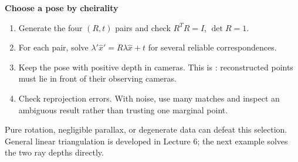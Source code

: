 \documentclass[letterpaper,11pt,english,openany,oneside]{jupyterBook}
\begin{document}
\begin{TextbookBox}
\textbf{Choose a pose by cheirality}\par\smallskip
\begin{enumerate}
%
\item {}
\sphinxAtStartPar
Generate the four \((R,t)\) pairs and check \(R^TR=I\), \(\det R=1\).

\item {}
\sphinxAtStartPar
For each pair, solve \(\lambda'\widehat x'=R\lambda\widehat x+t\) for several reliable correspondences.

\item {}
\sphinxAtStartPar
Keep the pose with positive depth in  cameras. This is : reconstructed points must lie in front of their observing cameras.

\item {}
\sphinxAtStartPar
Check reprojection errors. With noise, use many matches and inspect an ambiguous result rather than trusting one marginal point.

\end{enumerate}

\sphinxAtStartPar
Pure rotation, negligible parallax, or degenerate data can defeat this selection. General linear triangulation is developed in Lecture 6; the next example solves the two ray depths directly.

\end{TextbookBox}
\label{\detokenize{lectures/lecture04/essential:ex-lec04-pose}}
\end{document}
